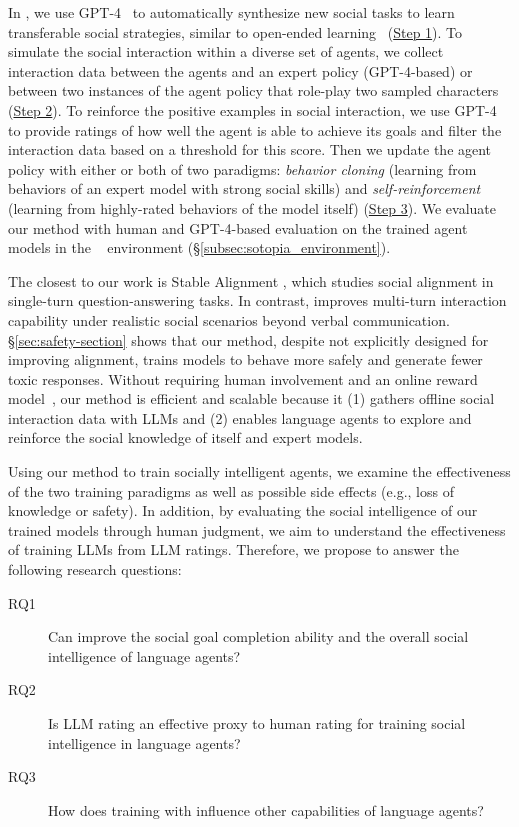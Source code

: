 In \model, we use GPT-4~\cite{openai2023gpt4} to automatically synthesize new social tasks to learn transferable social strategies, similar to open-ended learning~\citep{team2021open} (\hyperref[sec:method_social_task_generation]{Step 1}). 
To simulate the social interaction within a diverse set of agents, we collect interaction data between the agents and an expert policy (GPT-4-based) or between two instances of the agent policy that role-play two sampled characters (\hyperref[sec:method_collecting_social_interaction_data]{Step 2}). To reinforce the positive examples in social interaction, we use GPT-4 to provide ratings of how well the agent is able to achieve its goals and filter the interaction data based on a threshold for this score. Then we update the agent policy with either or both of two paradigms: \emph{behavior cloning} (learning from behaviors of an expert model with strong social skills) and \emph{self-reinforcement} (learning from highly-rated behaviors of the model itself) (\hyperref[sec:agent_policy_update]{Step 3}). We evaluate our method with human and GPT-4-based evaluation on the trained agent models in the \sotopia~\citep{sotopia} environment (\S\ref{subsec:sotopia_environment}).

The closest to our work is Stable Alignment \citep{liu2023training}, which studies social alignment in single-turn question-answering tasks. In contrast, \model improves multi-turn interaction capability under realistic social scenarios beyond verbal communication. \S\ref{sec:safety-section} shows that our method, despite not explicitly designed for improving alignment, trains models to behave more safely and generate fewer toxic responses. 
Without requiring human involvement and an online reward model~\citep{ziegler2020finetuning, ouyang2022training}, our method is efficient and scalable because it (1) gathers offline social interaction data with LLMs and (2) enables language agents to explore and reinforce the social knowledge of itself and expert models.

Using our method to train socially intelligent agents, we examine the effectiveness of the two training paradigms as well as possible side effects (e.g., loss of knowledge or safety). In addition, by evaluating the social intelligence of our trained models through human judgment, we aim to understand the effectiveness of training LLMs from LLM ratings. Therefore, we propose to answer the following research questions:

\begin{description}

\item[RQ1] Can \model improve the social goal completion ability and the overall social intelligence of language agents?

\item[RQ2] Is LLM rating an effective proxy to human rating for training social intelligence in language agents?

\item[RQ3] How does training with \model influence other capabilities of language agents?

\end{description}

